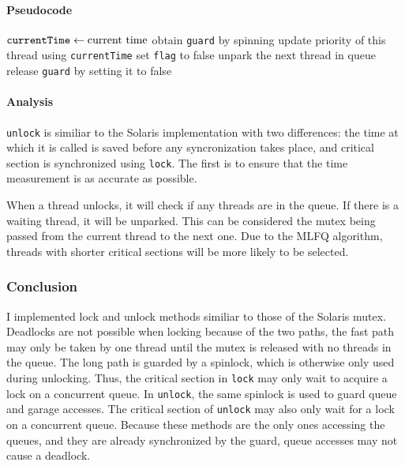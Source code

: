 \documentclass{article}
\begin{document}
\begin{multicols*}{2}
\paragraph{Pseudocode}
\begin{algorithmic}[1]
	\State $\verb|currentTime| \gets \text{current time}$
	\State obtain \verb|guard| by spinning
	\State update priority of this thread using \verb|currentTime|
		\State set \verb|flag| to false
	\Else
		\State unpark the next thread in queue
	\EndIf
	\State release \verb|guard| by setting it to false
\end{algorithmic}
\paragraph{Analysis}
\verb|unlock| is similiar to the Solaris implementation with two differences: the time at which it is called is saved before any syncronization takes place, and critical section is synchronized using \verb|lock|. The first is to ensure that the time measurement is as accurate as possible.

When a thread unlocks, it will check if any threads are in the queue. If there is a waiting thread, it will be unparked. This can be considered the mutex being passed from the current thread to the next one. Due to the MLFQ algorithm, threads with shorter critical sections will be more likely to be selected.
\subsubsection{Conclusion}
I implemented lock and unlock methods similiar to those of the Solaris mutex. Deadlocks are not possible when locking because of the two paths, the fast path may only be taken by one thread until the mutex is released with no threads in the queue. The long path is guarded by a spinlock, which is otherwise only used during unlocking. Thus, the critical section in \verb|lock| may only wait to acquire a lock on a concurrent queue. In \verb|unlock|, the same spinlock is used to guard queue and garage accesses. The critical section of \verb|unlock| may also only wait for a lock on a concurrent queue. Because these methods are the only ones accessing the queues, and they are already synchronized by the guard, queue accesses may not cause a deadlock.
\end{multicols*}
\end{document}

